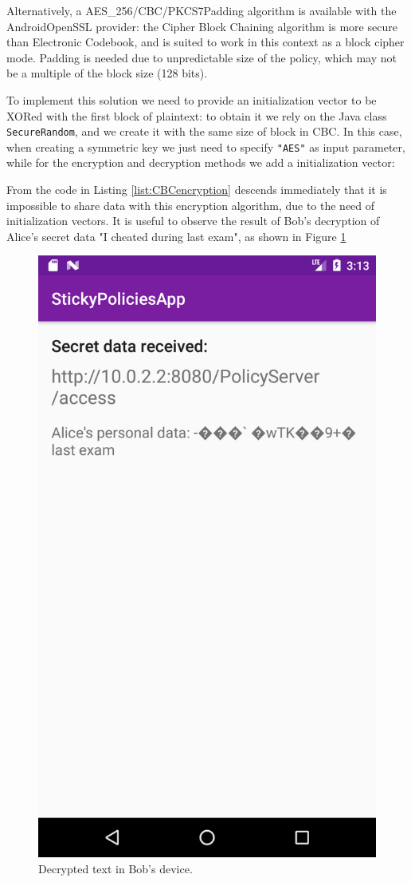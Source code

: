 

Alternatively, a AES\_256/CBC/PKCS7Padding  algorithm is available with the AndroidOpenSSL provider: the Cipher Block Chaining algorithm is more secure than Electronic Codebook, and is suited to work in this context as a block cipher mode. Padding is needed due to unpredictable size of the policy, which may not be a multiple of the block size (128 bits).

To implement this solution we need to provide an initialization vector to be XORed with the first block of plaintext: to obtain it we rely on the Java class \texttt{SecureRandom}, and we create it with the same size of block in CBC. In this case, when creating a symmetric key we just need to specify \texttt{"AES"} as input parameter, while for the encryption and decryption methods we add a initialization vector:



From the code in Listing \ref{list:CBCencryption} descends immediately that it is impossible to share data with this encryption algorithm, due to the need of initialization vectors. It is useful to observe the result of Bob's decryption of Alice's secret data "I cheated during last exam", as shown in Figure \ref{fig:DecryptCBCInvalidIV}

\begin{figure}
	\centering
	\includegraphics[width=0.35\linewidth]{DecryptCBCInvalidIV.png}
	\caption{Decrypted text in Bob's device.}
	\label{fig:DecryptCBCInvalidIV}
\end{figure}

